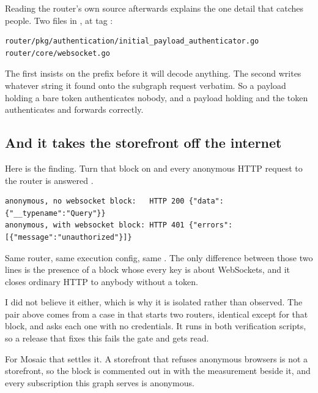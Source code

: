 Reading the router's own source afterwards explains the one detail that catches
people. Two files in , at tag :

\begin{verbatim}
router/pkg/authentication/initial_payload_authenticator.go
router/core/websocket.go
\end{verbatim}

The first insists on the  prefix before it will decode anything.
The second writes whatever string it found onto the subgraph request verbatim.
So a payload holding a bare token authenticates nobody, and a payload holding
 and the token authenticates and forwards correctly.

\subsection*{And it takes the storefront off the internet}

%
Here is the finding. Turn that block on and every anonymous HTTP request to the
router is answered .

\begin{verbatim}
anonymous, no websocket block:   HTTP 200 {"data":{"__typename":"Query"}}
anonymous, with websocket block: HTTP 401 {"errors":[{"message":"unauthorized"}]}
\end{verbatim}

Same router, same execution config, same .
The only difference between those two lines is the presence of a block whose
every key is about WebSockets, and it closes ordinary HTTP to anybody without a
token.

I did not believe it either, which is why it is isolated rather than observed.
The pair above comes from a case in  that starts
two routers, identical except for that block, and asks each one
 with no credentials. It runs in both verification
scripts, so a release that fixes this fails the gate and gets read.

For Mosaic that settles it. A storefront that refuses anonymous browsers is not
a storefront, so the block is commented out in  with
the measurement beside it, and every subscription this graph serves is
anonymous.

